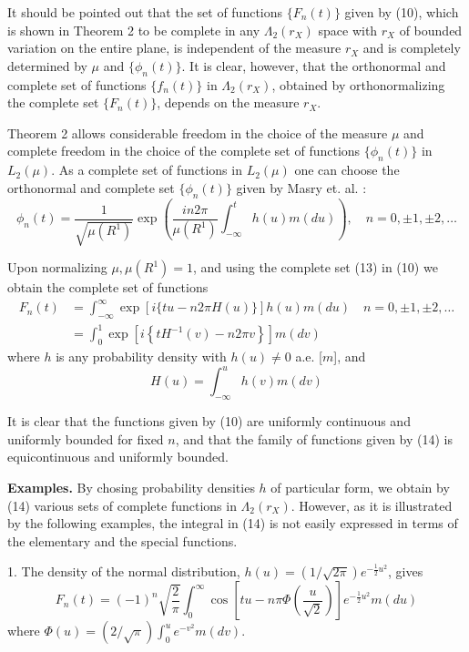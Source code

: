 \documentclass{article}
\begin{document}
It should be pointed out that the set of functions $\{F_{n}(t)\}$ given by (10), which is shown in Theorem 2 to be complete in any $\Lambda_{2}(r_{X})$ space with $r_{X}$ of bounded variation on the entire plane, is independent of the measure $r_{X}$ and is completely determined by $\mu$ and $\{\phi_{n}(t)\}$. It is clear, however, that the orthonormal and complete set of functions $\{f_{n}(t)\}$ in $\Lambda_{2}(r_{X})$, obtained by orthonormalizing the complete set $\{F_{n}(t)\}$, depends on the measure $r_{X}$.

Theorem 2 allows considerable freedom in the choice of the measure $\mu$ and complete freedom in the choice of the complete set of functions $\{\phi_{n}(t)\}$ in $L_{2}(\mu)$. As a complete set of functions in $L_{2}(\mu)$ one can choose the orthonormal and complete set $\{\phi_{n}(t)\}$ given by Masry et. al. \cite{masry1968}:
\[
\phi_{n}(t)=\frac{1}{\sqrt{\mu(R^{1})}} \exp\left(\frac{i n 2 \pi}{\mu(R^{1})} \int_{-\infty}^{t} h(u) m(d u)\right), \quad n=0, \pm 1, \pm 2, \ldots
\]

Upon normalizing $\mu, \mu(R^{1})=1$, and using the complete set (13) in (10) we obtain the complete set of functions
\[
\begin{aligned}
F_{n}(t) &=\int_{-\infty}^{\infty} \exp [i\{t u-n 2 \pi H(u)\}] h(u) m(d u) \quad n=0, \pm 1, \pm 2, \ldots \\
&=\int_{0}^{1} \exp \left[i\left\{t H^{-1}(v)-n 2 \pi v\right\}\right] m(d v)
\end{aligned}
\]
where $h$ is any probability density with $h(u) \neq 0$ a.e. [$m$], and
\[
H(u)=\int_{-\infty}^{u} h(v) m(d v)
\]

It is clear that the functions given by (10) are uniformly continuous and uniformly bounded for fixed $n$, and that the family of functions given by (14) is equicontinuous and uniformly bounded.

\textbf{Examples.} By chosing probability densities $h$ of particular form, we obtain by (14) various sets of complete functions in $\Lambda_{2}(r_{X})$. However, as it is illustrated by the following examples, the integral in (14) is not easily expressed in terms of the elementary and the special functions.

1. The density of the normal distribution, $h(u)=(1 / \sqrt{2 \pi}) e^{-\frac{1}{2} u^{2}}$, gives
\[
F_{n}(t)=(-1)^{n} \sqrt{\frac{2}{\pi}} \int_{0}^{\infty} \cos \left[t u-n \pi \Phi\left(\frac{u}{\sqrt{2}}\right)\right] e^{-\frac{1}{2} u^{2}} m(d u)
\]
where $\Phi(u)=(2 / \sqrt{\pi}) \int_{0}^{u} e^{-v^{2}} m(d v)$.
\end{document}
